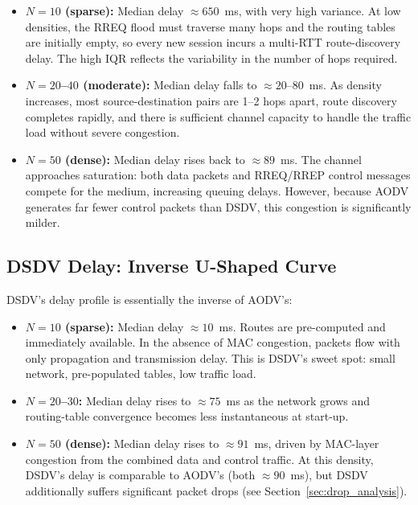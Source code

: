 \begin{itemize}
  \item \textbf{$N = 10$ (sparse):} Median delay $\approx 650$~ms, with very high
    variance. At low densities, the RREQ flood must traverse many hops and the routing
    tables are initially empty, so every new session incurs a multi-RTT route-discovery
    delay. The high IQR reflects the variability in the number of hops required.
  \item \textbf{$N = 20$--$40$ (moderate):} Median delay falls to $\approx 20$--$80$~ms.
    As density increases, most source-destination pairs are 1--2 hops apart, route
    discovery completes rapidly, and there is sufficient channel capacity to handle the
    traffic load without severe congestion.
  \item \textbf{$N = 50$ (dense):} Median delay rises back to $\approx 89$~ms. The
    channel approaches saturation: both data packets and RREQ/RREP control messages
    compete for the medium, increasing queuing delays. However, because AODV generates
    far fewer control packets than DSDV, this congestion is significantly milder.
\end{itemize}

\subsection{DSDV Delay: Inverse U-Shaped Curve}

DSDV's delay profile is essentially the inverse of AODV's:

\begin{itemize}
  \item \textbf{$N = 10$ (sparse):} Median delay $\approx 10$~ms. Routes are
    pre-computed and immediately available. In the absence of MAC congestion, packets
    flow with only propagation and transmission delay. This is DSDV's sweet spot: small
    network, pre-populated tables, low traffic load.
  \item \textbf{$N = 20$--$30$:} Median delay rises to $\approx 75$~ms as the network
    grows and routing-table convergence becomes less instantaneous at start-up.
  \item \textbf{$N = 50$ (dense):} Median delay rises to $\approx 91$~ms, driven by
    MAC-layer congestion from the combined data and control traffic. At this density,
    DSDV's delay is comparable to AODV's (both $\approx 90$~ms), but DSDV additionally
    suffers significant packet drops (see Section~\ref{sec:drop_analysis}).
\end{itemize}

